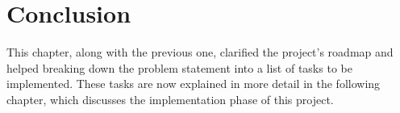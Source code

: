\section{Conclusion}
This chapter, along with the previous one, clarified the project's roadmap and helped breaking down the problem statement into a list of tasks to be implemented. These tasks are now explained in more detail in the following chapter, which discusses the implementation phase of this project.